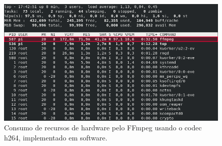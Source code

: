 \begin{figure}[H]
	\centering
	\includegraphics[width=1\textwidth]{figuras/top_ffmpeg_h264.png}
	\caption{Consumo de recursos de hardware pelo FFmpeg usando o codec h264, implementado em software.}
	\label{fig:top_ffmpeg_h264}
\end{figure}





